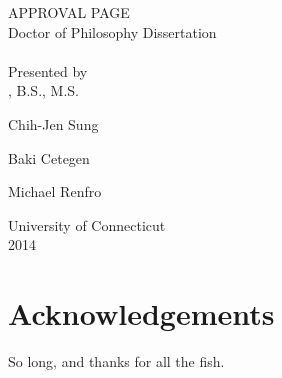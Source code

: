 \documentclass[12pt]{report}
\newcommand{\blankline}{\vspace*{\baselineskip}}
\begin{document}
\setcounter{page}{1}
\begin{center}
APPROVAL PAGE \\
Doctor of Philosophy Dissertation \\
\thetitle \\
\blankline \blankline
Presented by \\
\theauthor, B.S., M.S. \\
\end{center}
\blankline
{}
\vspace{-0.5\baselineskip}
\begin{center}
Chih-Jen Sung
\end{center}
\blankline
{}
\vspace{-0.5\baselineskip}
\begin{center}
Baki Cetegen
\end{center}
\blankline
{}
\vspace{-0.5\baselineskip}
\begin{center}
Michael Renfro
\end{center}
\blankline \blankline \blankline \blankline \blankline
\begin{center}
University of Connecticut \\
2014
\end{center}
\newpage

{} 
\chapter*{Acknowledgements}
So long, and thanks for all the fish.
\newpage

\tableofcontents
\newpage

\setcounter{page}{1}













\printbibliography
\end{document}
